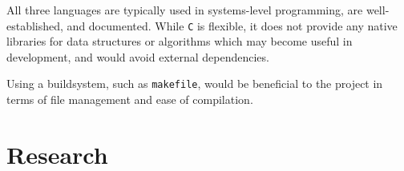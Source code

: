 \documentclass{article}
\begin{document}
    All three languages are typically used in systems-level programming, are well-established, and documented.
    While \texttt{C} is flexible, it does not provide any native libraries for data structures or algorithms which may become useful in development, and would avoid external dependencies.

    Using a buildsystem, such as \texttt{makefile}, would be beneficial to the project in terms of file management and ease of compilation.

%
%
%
%

    \section{Research}\label{sec:research}
\end{document}
